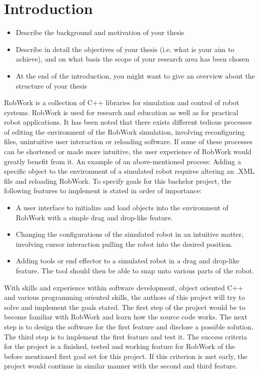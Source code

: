 
\section{Introduction}
\begin{itemize}
\item Describe the background and motivation of your thesis
\item Describe in detail the objectives of your thesis (i.e. what is your aim to achieve), and on what basis the scope of your research area has been chosen
\item At the end of the introduction, you might want to give an overview about the structure of your thesis
\end{itemize}

RobWork is a collection of C++ libraries for simulation and control of robot systems. RobWork is used for research and education as well as for practical robot applications. It has been noted that there exists different tedious processes of editing the environment of the RobWork simulation, involving reconfiguring files, unintuitive user interaction or reloading software. If some of these processes can be shortened or made more intuitive, the user experience of RobWork would greatly benefit from it.
An example of an above-mentioned process: Adding a specific object to the environment of a simulated robot requires altering an .XML file and reloading RobWork.    
To specify goals for this bachelor project, the following features to implement is stated in order of importance:

\begin{itemize}
\item A user interface to initialize and load objects into the environment of RobWork with a simple drag and drop-like feature. 
\item Changing the configurations of the simulated robot in an intuitive matter, involving cursor interaction pulling the robot into the desired position.
\item Adding tools or end effector to a simulated robot in a drag and drop-like 
feature. The tool should then be able to snap unto various parts of the robot.
\end{itemize}

With skills and experience within software development, object oriented C++ and various programming oriented skills, the authors of this project will try to solve and implement the goals stated. The first step of the project would be to become familiar with RobWork and learn how the source code works. The next step is to design the software for the first feature and disclose a possible solution. The third step is to implement the first feature and test it.
 The success criteria for the project is a finished, tested and working feature for RobWork of the before mentioned first goal set for this project. If this criterion is met early, the project would continue in similar manner with the second and third feature.


\clearpage
